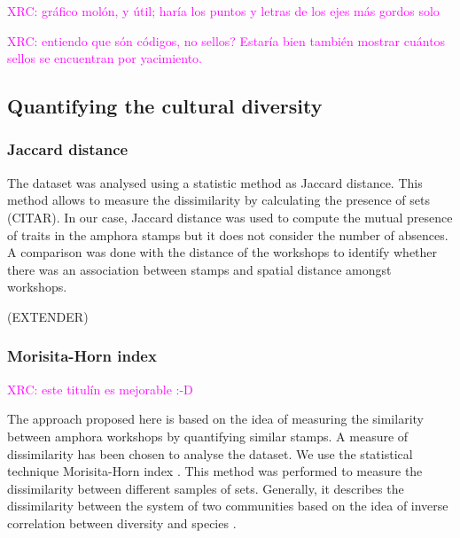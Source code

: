 \documentclass[review]{elsarticle}
\newcommand{\memo}[2]{\textcolor{#1}{#2}}
\newcommand{\xavi}[1]{\memo{magenta}{XRC: #1\\}}
\begin{document}
\xavi{gráfico molón, y útil; haría los puntos y letras de los ejes más gordos solo}

\xavi{entiendo que són códigos, no sellos? Estaría bien también mostrar cuántos sellos se encuentran por yacimiento.}




\subsection{Quantifying the cultural diversity}


\subsubsection{Jaccard distance}

The dataset was analysed using a statistic method as Jaccard distance. This method allows to measure the dissimilarity by calculating the presence of sets (CITAR). In our case, Jaccard distance was used to compute the mutual presence of traits in the amphora stamps but it does not consider the number of absences. A comparison was done with the distance of the workshops to identify whether there was an association between stamps and spatial distance amongst workshops. 

(EXTENDER)

\subsubsection{Morisita-Horn index}


\xavi{este titulín es mejorable :-D}


The approach proposed here is based on the idea of measuring the similarity between amphora workshops by quantifying similar stamps. A measure of dissimilarity has been chosen to analyse the dataset. We use the statistical technique Morisita-Horn index \citep{morisita_measuring_1959, horn_measurement_1966}. This method was performed to measure the dissimilarity between different samples of sets. Generally, it describes the dissimilarity between the system of two communities based on the idea of inverse correlation between diversity and species \citep{magurran_why_1988}.
\end{document}
